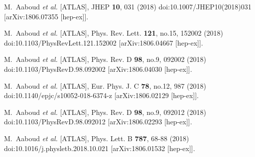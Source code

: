 \begin{thebibliography}{9}
M.~Aaboud \textit{et al.} [ATLAS],
JHEP \textbf{10}, 031 (2018)
doi:10.1007/JHEP10(2018)031
[arXiv:1806.07355 [hep-ex]].

M.~Aaboud \textit{et al.} [ATLAS],
Phys. Rev. Lett. \textbf{121}, no.15, 152002 (2018)
doi:10.1103/PhysRevLett.121.152002
[arXiv:1806.04667 [hep-ex]].

M.~Aaboud \textit{et al.} [ATLAS],
Phys. Rev. D \textbf{98}, no.9, 092002 (2018)
doi:10.1103/PhysRevD.98.092002
[arXiv:1806.04030 [hep-ex]].

M.~Aaboud \textit{et al.} [ATLAS],
Eur. Phys. J. C \textbf{78}, no.12, 987 (2018)
doi:10.1140/epjc/s10052-018-6374-z
[arXiv:1806.02129 [hep-ex]].

M.~Aaboud \textit{et al.} [ATLAS],
Phys. Rev. D \textbf{98}, no.9, 092012 (2018)
doi:10.1103/PhysRevD.98.092012
[arXiv:1806.02293 [hep-ex]].

M.~Aaboud \textit{et al.} [ATLAS],
Phys. Lett. B \textbf{787}, 68-88 (2018)
doi:10.1016/j.physletb.2018.10.021
[arXiv:1806.01532 [hep-ex]].


\end{thebibliography}
